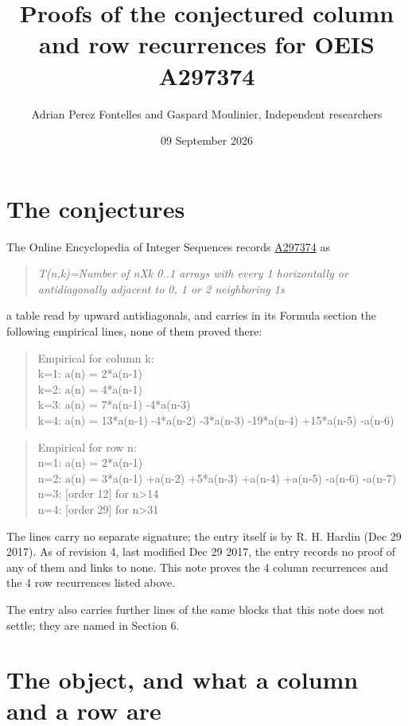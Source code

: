 \documentclass[11pt]{article}
\title{Proofs of the conjectured column and row recurrences for OEIS A297374}
\author{Adrian Perez Fontelles and Gaspard Moulinier, Independent researchers}
\date{09 September 2026}
\theoremstyle{definition}
\begin{document}
\maketitle
\section{The conjectures}

The Online Encyclopedia of Integer Sequences records \href{https://oeis.org/A297374}{A297374} as

\begin{quote}\itshape T(n,k)=Number of nXk 0..1 arrays with every 1 horizontally or antidiagonally adjacent to 0, 1 or 2 neighboring 1s\end{quote}

a table read by upward antidiagonals, and carries in its Formula section the following empirical lines, none of them proved there:

\begin{quote}\ttfamily Empirical for column k:\\
k=1: a(n) = 2*a(n-1)\\k=2: a(n) = 4*a(n-1)\\k=3: a(n) = 7*a(n-1) -4*a(n-3)\\k=4: a(n) = 13*a(n-1) -4*a(n-2) -3*a(n-3) -19*a(n-4) +15*a(n-5) -a(n-6)\end{quote}

\begin{quote}\ttfamily Empirical for row n:\\
n=1: a(n) = 2*a(n-1)\\n=2: a(n) = 3*a(n-1) +a(n-2) +5*a(n-3) +a(n-4) +a(n-5) -a(n-6) -a(n-7)\\n=3: [order 12] for n>14\\n=4: [order 29] for n>31\end{quote}

The lines carry no separate signature; the entry itself is by R. H. Hardin (Dec 29 2017). As of revision 4, last modified Dec 29 2017, the entry records no proof of any of them and links to none. This note proves the 4 column recurrences and the 4 row recurrences listed above.

The entry also carries further lines of the same blocks that this note does not settle; they are named in Section 6.

\section{The object, and what a column and a row are}
\end{document}
